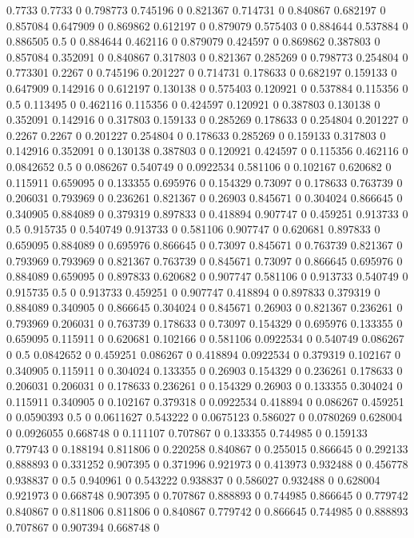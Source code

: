 0.7733 0.7733 0
0.798773 0.745196 0
0.821367 0.714731 0
0.840867 0.682197 0
0.857084 0.647909 0
0.869862 0.612197 0
0.879079 0.575403 0
0.884644 0.537884 0
0.886505 0.5 0
0.884644 0.462116 0
0.879079 0.424597 0
0.869862 0.387803 0
0.857084 0.352091 0
0.840867 0.317803 0
0.821367 0.285269 0
0.798773 0.254804 0
0.773301 0.2267 0
0.745196 0.201227 0
0.714731 0.178633 0
0.682197 0.159133 0
0.647909 0.142916 0
0.612197 0.130138 0
0.575403 0.120921 0
0.537884 0.115356 0
0.5 0.113495 0
0.462116 0.115356 0
0.424597 0.120921 0
0.387803 0.130138 0
0.352091 0.142916 0
0.317803 0.159133 0
0.285269 0.178633 0
0.254804 0.201227 0
0.2267 0.2267 0
0.201227 0.254804 0
0.178633 0.285269 0
0.159133 0.317803 0
0.142916 0.352091 0
0.130138 0.387803 0
0.120921 0.424597 0
0.115356 0.462116 0
0.0842652 0.5 0
0.086267 0.540749 0
0.0922534 0.581106 0
0.102167 0.620682 0
0.115911 0.659095 0
0.133355 0.695976 0
0.154329 0.73097 0
0.178633 0.763739 0
0.206031 0.793969 0
0.236261 0.821367 0
0.26903 0.845671 0
0.304024 0.866645 0
0.340905 0.884089 0
0.379319 0.897833 0
0.418894 0.907747 0
0.459251 0.913733 0
0.5 0.915735 0
0.540749 0.913733 0
0.581106 0.907747 0
0.620681 0.897833 0
0.659095 0.884089 0
0.695976 0.866645 0
0.73097 0.845671 0
0.763739 0.821367 0
0.793969 0.793969 0
0.821367 0.763739 0
0.845671 0.73097 0
0.866645 0.695976 0
0.884089 0.659095 0
0.897833 0.620682 0
0.907747 0.581106 0
0.913733 0.540749 0
0.915735 0.5 0
0.913733 0.459251 0
0.907747 0.418894 0
0.897833 0.379319 0
0.884089 0.340905 0
0.866645 0.304024 0
0.845671 0.26903 0
0.821367 0.236261 0
0.793969 0.206031 0
0.763739 0.178633 0
0.73097 0.154329 0
0.695976 0.133355 0
0.659095 0.115911 0
0.620681 0.102166 0
0.581106 0.0922534 0
0.540749 0.086267 0
0.5 0.0842652 0
0.459251 0.086267 0
0.418894 0.0922534 0
0.379319 0.102167 0
0.340905 0.115911 0
0.304024 0.133355 0
0.26903 0.154329 0
0.236261 0.178633 0
0.206031 0.206031 0
0.178633 0.236261 0
0.154329 0.26903 0
0.133355 0.304024 0
0.115911 0.340905 0
0.102167 0.379318 0
0.0922534 0.418894 0
0.086267 0.459251 0
0.0590393 0.5 0
0.0611627 0.543222 0
0.0675123 0.586027 0
0.0780269 0.628004 0
0.0926055 0.668748 0
0.111107 0.707867 0
0.133355 0.744985 0
0.159133 0.779743 0
0.188194 0.811806 0
0.220258 0.840867 0
0.255015 0.866645 0
0.292133 0.888893 0
0.331252 0.907395 0
0.371996 0.921973 0
0.413973 0.932488 0
0.456778 0.938837 0
0.5 0.940961 0
0.543222 0.938837 0
0.586027 0.932488 0
0.628004 0.921973 0
0.668748 0.907395 0
0.707867 0.888893 0
0.744985 0.866645 0
0.779742 0.840867 0
0.811806 0.811806 0
0.840867 0.779742 0
0.866645 0.744985 0
0.888893 0.707867 0
0.907394 0.668748 0
